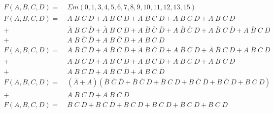 \documentclass[12pt,letterpaper,titlepage]{report}
\begin{document}
\begin{enumerate}[label=\alph*)]
	\begin{align*}
	F(A,B,C,D) =\; &\Sigma m(0,1,3,4,5,6,7,8,9,10,11,12,13,15)\\
	F(A,B,C,D) =\; & \overline{A}\;\overline{B}\;\overline{C}\;\overline{D}
	         	   + \overline{A}\;\overline{B}\;\overline{C}\;D
	         	   + \overline{A}\;\overline{B}\;C\;D
	         	   + \overline{A}\;B\;\overline{C}\;\overline{D}
	         	   + \overline{A}\;B\;\overline{C}\;D
	           \\+ & \overline{A}\;B\;C\;\overline{D}
	         	   + \overline{A}\;B\;C\;D
	         	   + A\;\overline{B}\;\overline{C}\;\overline{D}
	         	   + A\;\overline{B}\;\overline{C}\;D
	         	   + A\;\overline{B}\;C\;\overline{D}
	         	   + A\;\overline{B}\;C\;D
	           \\+ & A\;B\;\overline{C}\;\overline{D}
	         	   + A\;B\;\overline{C}\;D
	         	   + A\;B\;C\;D 
	         	   \\
	F(A,B,C,D) =\; & \overline{A}\;\overline{B}\;\overline{C}\;\overline{D}
	         	   + A\;\overline{B}\;\overline{C}\;\overline{D}
	         	   + \overline{A}\;\overline{B}\;\overline{C}\;D
	         	   + A\;\overline{B}\;\overline{C}\;D
	               + \overline{A}\;\overline{B}\;C\;D
	         	   + A\;\overline{B}\;C\;D
	           \\+ & \overline{A}\;B\;\overline{C}\;\overline{D}
	               + A\;B\;\overline{C}\;\overline{D}
	         	   + \overline{A}\;B\;\overline{C}\;D
	         	   + A\;B\;\overline{C}\;D
	         	   + \overline{A}\;B\;C\;D
	           \\+ & A\;B\;C\;D
	         	   + A\;\overline{B}\;C\;\overline{D}
	               + \overline{A}\;B\;C\;\overline{D}
	         	   \\
	F(A,B,C,D) =\; & (\overline{A} + A)
				   ( \overline{B}\;\overline{C}\;\overline{D}
	         	   + \overline{B}\;\overline{C}\;D
	               + \overline{B}\;C\;D
	               + B\;\overline{C}\;\overline{D}
	         	   + B\;\overline{C}\;D
	         	   + B\;C\;D
	         	   )
	           \\+ & A\;\overline{B}\;C\;\overline{D}
	               + \overline{A}\;B\;C\;\overline{D}
	               \\
    F(A,B,C,D) =\; & 
				     \overline{B}\;\overline{C}\;\overline{D}
	               +           B \;\overline{C}\;\overline{D}
	         	   + \overline{B}\;\overline{C}\;D
	         	   +           B \;\overline{C}\;D
	               + \overline{B}\;C\;D
	         	   +           B \;C\;D

\end{align*}
\end{enumerate}
\end{document}
